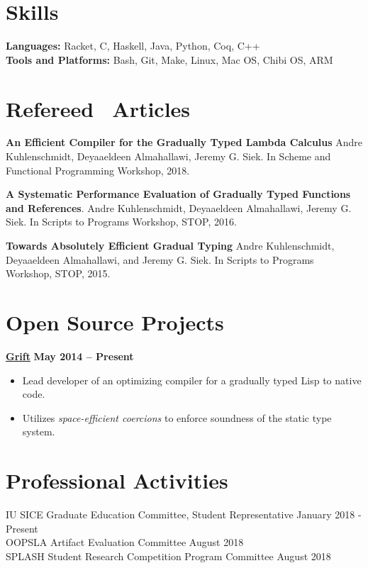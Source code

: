 \documentclass[resmargin,line]{res}
\begin{document}
\begin{resume}

\section{\sc Skills}
{\bf Languages:} Racket, C, Haskell, Java, Python, Coq, C++\\
{\bf Tools and Platforms:} Bash, Git, Make, Linux, Mac OS, Chibi OS, ARM

\section{\sc Refereed \, Articles}

{\bf An Efficient Compiler for the Gradually Typed Lambda Calculus}
Andre Kuhlenschmidt, Deyaaeldeen Almahallawi, Jeremy G. Siek.
In Scheme and Functional Programming Workshop, 2018.

{\bf A Systematic Performance Evaluation of Gradually Typed Functions
  and References}.
%
Andre Kuhlenschmidt, Deyaaeldeen Almahallawi, Jeremy G. Siek.
%
In Scripts to Programs Workshop, STOP, 2016.

{\bf Towards Absolutely Efficient Gradual Typing}
%
Andre Kuhlenschmidt, Deyaaeldeen Almahallawi, and Jeremy G. Siek.
%
In Scripts to Programs Workshop, STOP, 2015.

\section{\sc Open Source Projects}

{\bf \href{github.com/Gradual-Typing/Grift/}{Grift}}
\hfill {\bf May 2014 -- Present}\\
\vspace*{-.35cm}
\begin{itemize}
\item Lead developer of an optimizing compiler for a gradually typed Lisp to
  native code.
\item Utilizes {\em space-efficient coercions} to enforce
  soundness of the static type system.
\end{itemize}


\section{\sc Professional Activities}

IU SICE Graduate Education Committee, Student Representative
\hfill January 2018 - Present \\
OOPSLA Artifact Evaluation Committee \hfill August 2018\\
SPLASH Student Research Competition Program Committee \hfill August 2018\\

\end{resume}
\end{document}
